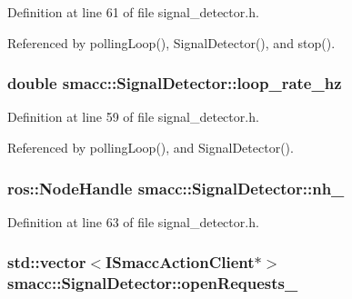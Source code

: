 Definition at line 61 of file signal\+\_\+detector.\+h.



Referenced by polling\+Loop(), Signal\+Detector(), and stop().

\subsubsection[{\texorpdfstring{loop\+\_\+rate\+\_\+hz}{loop_rate_hz}}]{\setlength{\rightskip}{0pt plus 5cm}double smacc\+::\+Signal\+Detector\+::loop\+\_\+rate\+\_\+hz\hspace{0.3cm}{\ttfamily [private]}}\hypertarget{classsmacc_1_1SignalDetector_a41a2ae4262ed350f46d8b886bdc1dfa5}{}\label{classsmacc_1_1SignalDetector_a41a2ae4262ed350f46d8b886bdc1dfa5}


Definition at line 59 of file signal\+\_\+detector.\+h.



Referenced by polling\+Loop(), and Signal\+Detector().

\subsubsection[{\texorpdfstring{nh\+\_\+}{nh_}}]{\setlength{\rightskip}{0pt plus 5cm}ros\+::\+Node\+Handle smacc\+::\+Signal\+Detector\+::nh\+\_\+\hspace{0.3cm}{\ttfamily [private]}}\hypertarget{classsmacc_1_1SignalDetector_a5c416677fd537afc79f2fbc2e68b2dee}{}\label{classsmacc_1_1SignalDetector_a5c416677fd537afc79f2fbc2e68b2dee}


Definition at line 63 of file signal\+\_\+detector.\+h.

\subsubsection[{\texorpdfstring{open\+Requests\+\_\+}{openRequests_}}]{\setlength{\rightskip}{0pt plus 5cm}std\+::vector$<${\bf I\+Smacc\+Action\+Client}$\ast$$>$ smacc\+::\+Signal\+Detector\+::open\+Requests\+\_\+\hspace{0.3cm}{\ttfamily [private]}}\hypertarget{classsmacc_1_1SignalDetector_a3f7e46b9fa9fcac9f5bc72a95ab20ca9}{}\label{classsmacc_1_1SignalDetector_a3f7e46b9fa9fcac9f5bc72a95ab20ca9}


